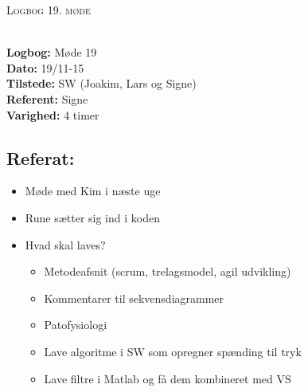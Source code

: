 \documentclass[a4paper,11pt,oneside]{memoir}
\newcommand{\R}{\ensuremath{\mathbb{R}}}
\begin{document}
\newpage



\begin{center} 
\huge{\textsc{Logbog 19. møde}}
\end{center}

\textbf{ }
\\
\textbf{Logbog:} Møde 19
\\
\textbf{Dato:} 19/11-15
\\
\textbf{Tilstede:} SW (Joakim, Lars og Signe)
\\
\textbf{Referent:} Signe
\\
\textbf{Varighed:} 4 timer
\\

\subsection{Referat:}
\begin{itemize}
\item Møde med Kim i næste uge 
\item Rune sætter sig ind i koden
\item Hvad skal laves?
\begin{itemize}
\item Metodeafsnit (scrum, trelagsmodel, agil udvikling) 
\item Kommentarer til sekvensdiagrammer
\item Patofysiologi 
\item Lave algoritme i SW som opregner spænding til tryk
\item Lave filtre i Matlab og få dem kombineret med VS
\end{itemize}
\end{itemize}


\newpage


\end{document}
